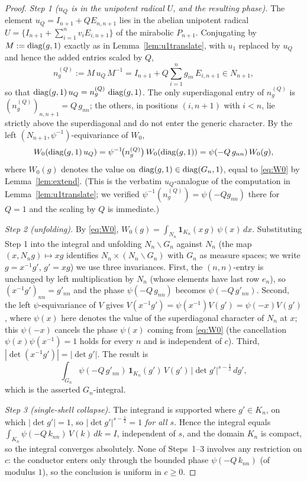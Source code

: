 \begin{proof}
\emph{Step 1 \textup{(}$u_Q$ is in the unipotent radical $U$, and the resulting phase\textup{)}.}
The element $u_Q=I_{n+1}+QE_{n,n+1}$ lies in the abelian unipotent radical
$U=\{I_{n+1}+\sum_{i=1}^{n}v_iE_{i,n+1}\}$ of the mirabolic $P_{n+1}$. Conjugating by
$M:=\operatorname{diag}(g,1)$ exactly as in Lemma~\ref{lem:u1translate}, with $u_1$ replaced by $u_Q$ and
hence the added entries scaled by $Q$,
\[
n_g^{(Q)}:=M\,u_Q\,M^{-1}=I_{n+1}+Q\sum_{i=1}^{n}g_{in}\,E_{i,n+1}\in N_{n+1},
\]
so that $\operatorname{diag}(g,1)\,u_Q=n_g^{(Q)}\,\operatorname{diag}(g,1)$. The only superdiagonal entry of
$n_g^{(Q)}$ is $(n_g^{(Q)})_{n,n+1}=Q\,g_{nn}$; the others, in positions $(i,n+1)$ with $i<n$,
lie strictly above the superdiagonal and do not enter the generic character. By the left
$(N_{n+1},\psi^{-1})$-equivariance of $W_0$,
\[
W_0(\operatorname{diag}(g,1)\,u_Q)=\psi^{-1}\!\big(n_g^{(Q)}\big)\,W_0(\operatorname{diag}(g,1))
=\psi(-Q\,g_{nn})\,W_0(g),
\]
where $W_0(g)$ denotes the value on $\operatorname{diag}(g,1)\in\operatorname{diag}(G_n,1)$, equal to \eqref{eq:W0}
by Lemma~\ref{lem:extend}. \textup{(}This is the verbatim $u_Q$-analogue of the computation in
Lemma~\ref{lem:u1translate}; we verified $\psi^{-1}(n_g^{(Q)})=\psi(-Qg_{nn})$ there for $Q=1$
and the scaling by $Q$ is immediate.\textup{)}

\emph{Step 2 \textup{(}unfolding\textup{)}.}
By \eqref{eq:W0}, $W_0(g)=\int_{N_n}\mathbf 1_{K_n}(x\,g)\,\psi(x)\,dx$. Substituting Step 1 into
the integral and unfolding $N_n\backslash G_n$ against $N_n$ \textup{(}the map
$(x,N_ng)\mapsto xg$ identifies $N_n\times(N_n\backslash G_n)$ with $G_n$ as measure spaces; we
write $g=x^{-1}g'$, $g'=xg$\textup{)} we use three invariances. First, the $(n,n)$-entry is
unchanged by left multiplication by $N_n$ \textup{(}whose elements have last row $e_n$\textup{)},
so $(x^{-1}g')_{nn}=g'_{nn}$ and the phase $\psi(-Q\,g_{nn})$ becomes $\psi(-Q\,g'_{nn})$.
Second, the left $\psi$-equivariance of $V$ gives
$V(x^{-1}g')=\psi(x^{-1})V(g')=\psi(-x)V(g')$, where $\psi(x)$ here denotes the value of the
superdiagonal character of $N_n$ at $x$; this $\psi(-x)$ cancels the phase $\psi(x)$ coming from
\eqref{eq:W0} \textup{(}the cancellation $\psi(x)\psi(x^{-1})=1$ holds for every $n$ and is
independent of $c$\textup{)}. Third, $|\det(x^{-1}g')|=|\det g'|$. The result is
\[
\int_{G_n}\psi(-Q\,g'_{nn})\,\mathbf 1_{K_n}(g')\,V(g')\,|\det g'|^{s-\frac12}\,dg' ,
\]
which is the asserted $G_n$-integral.

\emph{Step 3 \textup{(}single-shell collapse\textup{)}.}
The integrand is supported where $g'\in K_n$, on which $|\det g'|=1$, so $|\det g'|^{s-\frac12}=1$
\emph{for all $s$}. Hence the integral equals
$\int_{K_n}\psi(-Q\,k_{nn})\,V(k)\,dk=I$, independent of $s$, and the domain $K_n$ is compact, so
the integral converges absolutely. None of Steps~1--3 involves any restriction on $c$: the
conductor enters only through the bounded phase $\psi(-Q\,k_{nn})$ \textup{(}of modulus $1$\textup{)},
so the conclusion is uniform in $c\ge0$.
\end{proof}

